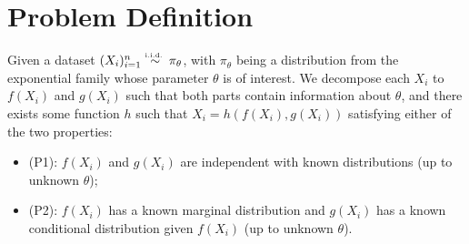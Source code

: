 \section{Problem Definition}\label{sec:problem_def}
Given a dataset $(X_i)_{i=1}^n \overset{\textrm{\tiny i.i.d.\ }}{\sim} \pi_\theta$, with $\pi_\theta$ being a distribution from the exponential family whose parameter $\theta$ is of interest. We decompose each $X_i$ to $f(X_i)$ and $g(X_i)$ such that both parts contain information about $\theta$, and there exists some function $h$ such that $X_i = h(f(X_i), g(X_i))$ satisfying either of the two properties:
\begin{itemize}
\item (P1): $f(X_i)$ and $g(X_i)$ are independent with known distributions (up to unknown $\theta$);
\item (P2): $f(X_i)$ has a known marginal distribution and $g(X_i)$ has a known conditional distribution given $f(X_i)$ (up to unknown $\theta$).
\end{itemize}